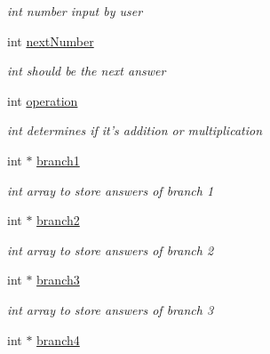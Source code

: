 \begin{DoxyCompactItemize}
\begin{DoxyCompactList}\small\item\em int number input by user \end{DoxyCompactList}\item 
\hypertarget{classgamemanager3_a21482197093a0718abe1dbefea1d271c}{int \hyperlink{classgamemanager3_a21482197093a0718abe1dbefea1d271c}{next\-Number}}\label{classgamemanager3_a21482197093a0718abe1dbefea1d271c}

\begin{DoxyCompactList}\small\item\em int should be the next answer \end{DoxyCompactList}\item 
\hypertarget{classgamemanager3_a4de64fedcafac16c16f82d060ea3dfd9}{int \hyperlink{classgamemanager3_a4de64fedcafac16c16f82d060ea3dfd9}{operation}}\label{classgamemanager3_a4de64fedcafac16c16f82d060ea3dfd9}

\begin{DoxyCompactList}\small\item\em int determines if it's addition or multiplication \end{DoxyCompactList}\item 
\hypertarget{classgamemanager3_a75ac6a769aa041f862935a5d8b2d73f1}{int $\ast$ \hyperlink{classgamemanager3_a75ac6a769aa041f862935a5d8b2d73f1}{branch1}}\label{classgamemanager3_a75ac6a769aa041f862935a5d8b2d73f1}

\begin{DoxyCompactList}\small\item\em int array to store answers of branch 1 \end{DoxyCompactList}\item 
\hypertarget{classgamemanager3_a092b5b440bb02ff1af30c7095d02e60c}{int $\ast$ \hyperlink{classgamemanager3_a092b5b440bb02ff1af30c7095d02e60c}{branch2}}\label{classgamemanager3_a092b5b440bb02ff1af30c7095d02e60c}

\begin{DoxyCompactList}\small\item\em int array to store answers of branch 2 \end{DoxyCompactList}\item 
\hypertarget{classgamemanager3_ab2fb5666a4a9328439f26da95d3afeac}{int $\ast$ \hyperlink{classgamemanager3_ab2fb5666a4a9328439f26da95d3afeac}{branch3}}\label{classgamemanager3_ab2fb5666a4a9328439f26da95d3afeac}

\begin{DoxyCompactList}\small\item\em int array to store answers of branch 3 \end{DoxyCompactList}\item 
\hypertarget{classgamemanager3_a68b028b1d71f9ebcdc76bd8acb48fb63}{int $\ast$ \hyperlink{classgamemanager3_a68b028b1d71f9ebcdc76bd8acb48fb63}{branch4}}\label{classgamemanager3_a68b028b1d71f9ebcdc76bd8acb48fb63}


\end{DoxyCompactItemize}
